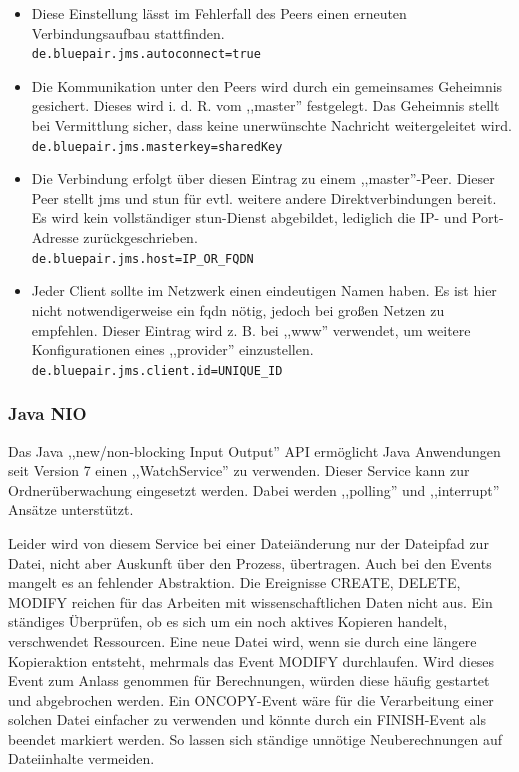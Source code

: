 \documentclass[oneside, ngerman, toc=bibliography,bibliography=totoc,listof=entryprefix, open=right,numbers=noenddot,fontsize=12pt]{scrbook}
\begin{document}
\begin{itemize}
    \item
    Diese Einstellung lässt im Fehlerfall des Peers einen erneuten Verbindungsaufbau stattfinden.\\
    \verb|de.bluepair.jms.autoconnect=true|
    
    \item Die Kommunikation unter den Peers wird durch ein gemeinsames Geheimnis gesichert. Dieses wird i. d. R. vom ,,master'' festgelegt. Das Geheimnis stellt bei  Vermittlung sicher, dass keine unerwünschte Nachricht weitergeleitet wird.\\  
    \verb|de.bluepair.jms.masterkey=sharedKey|
    
    \item Die Verbindung erfolgt über diesen Eintrag zu einem ,,master''-Peer.
    Dieser Peer stellt \acrshort{jms} und \acrshort{stun} für evtl. weitere andere Direktverbindungen bereit. Es wird kein vollständiger \acrshort{stun}-Dienst abgebildet, lediglich die IP- und Port-Adresse zurückgeschrieben.\\
    \verb|de.bluepair.jms.host=IP_OR_FQDN|
    \item Jeder Client sollte im Netzwerk einen eindeutigen Namen haben. Es ist hier nicht notwendigerweise ein \acrshort{fqdn} nötig, jedoch bei großen Netzen zu empfehlen. Dieser Eintrag wird z. B. bei ,,www'' verwendet, um weitere Konfigurationen eines ,,provider'' einzustellen.\\
  \verb|de.bluepair.jms.client.id=UNIQUE_ID|
\end{itemize}


\subsubsection{Java NIO}
Das Java ,,new/non-blocking Input Output'' API ermöglicht Java Anwendungen seit Version 7 einen ,,WatchService'' zu verwenden. Dieser Service kann zur Ordnerüberwachung eingesetzt werden. Dabei werden ,,polling'' und ,,interrupt'' Ansätze unterstützt.

Leider wird von diesem Service bei einer Dateiänderung nur der Dateipfad zur Datei, nicht aber Auskunft über den Prozess, übertragen. Auch bei den Events mangelt es an fehlender Abstraktion. Die Ereignisse CREATE, DELETE, MODIFY reichen für das Arbeiten mit wissenschaftlichen Daten nicht aus. Ein ständiges Überprüfen, ob es sich um ein noch aktives Kopieren handelt, verschwendet Ressourcen. Eine neue Datei wird, wenn sie durch eine längere Kopieraktion entsteht, mehrmals das Event MODIFY durchlaufen. Wird dieses Event zum Anlass genommen für Berechnungen, würden diese häufig gestartet und abgebrochen werden.  Ein ONCOPY-Event wäre für die Verarbeitung einer solchen Datei einfacher zu verwenden und könnte durch ein FINISH-Event als beendet markiert werden. So lassen sich ständige unnötige Neuberechnungen auf Dateiinhalte vermeiden.
\end{document}

